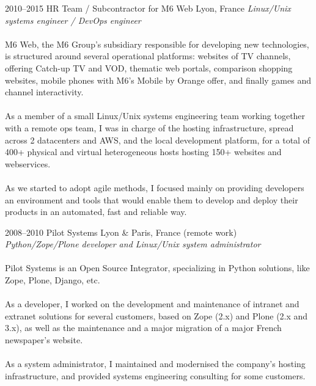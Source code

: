 \documentclass[]{friggeri-cv}
\begin{document}
\begin{entrylist}
  \entry
    {2010--2015}
    {HR Team / Subcontractor for M6 Web}
    {Lyon, France}
    {
      \textit{Linux/Unix systems engineer / DevOps engineer} \\
      \\
      M6 Web, the M6 Group’s subsidiary responsible for developing new
      technologies, is structured around several operational platforms:
      websites of TV channels, offering Catch-up TV and VOD, thematic web
      portals, comparison shopping websites, mobile phones with M6’s Mobile by
      Orange offer, and finally games and channel interactivity. \\
      \\
      As a member of a small Linux/Unix systems engineering team working
      together with a remote ops team, I was in charge of the hosting
      infrastructure, spread across 2 datacenters and AWS, and the local
      development platform, for a total of 400+ physical and virtual
      heterogeneous hosts hosting 150+ websites and webservices. \\
      \\
      As we started to adopt agile methods, I focused mainly on providing
      developers an environment and tools that would enable them to develop and
      deploy their products in an automated, fast and reliable way.
    }

  \entry
    {2008--2010}
    {Pilot Systems}
    {Lyon \& Paris, France (remote work)}
    {
        \textit{Python/Zope/Plone developer and Linux/Unix system
                administrator} \\
        \\
        Pilot Systems is an Open Source Integrator, specializing in Python
        solutions, like Zope, Plone, Django, etc. \\
        \\
        As a developer, I worked on the development and maintenance of intranet
        and extranet solutions for several customers, based on Zope (2.x) and
        Plone (2.x and 3.x), as well as the maintenance and a major migration
        of a major French newspaper's website. \\
        \\
        As a system administrator, I maintained and modernised the company's
        hosting infrastructure, and provided systems engineering consulting for
        some customers.
    }


\end{entrylist}
\end{document}
